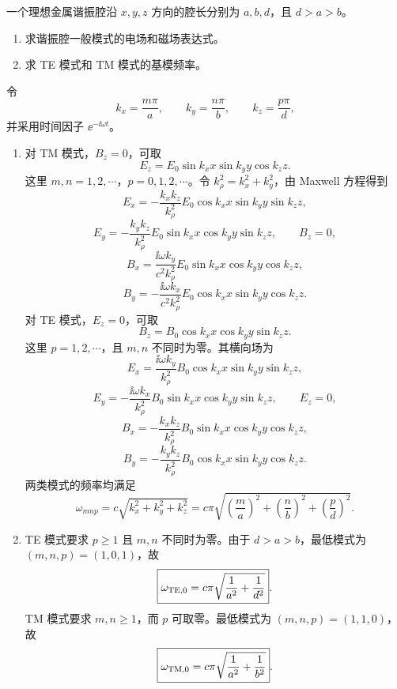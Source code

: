 \begin{question}[理想金属矩形谐振腔]
一个理想金属谐振腔沿 $x,y,z$ 方向的腔长分别为 $a,b,d$，且 $d>a>b$。
\begin{enumerate}
  \item 求谐振腔一般模式的电场和磁场表达式。
  \item 求 TE 模式和 TM 模式的基模频率。
\end{enumerate}
\begin{solution}
令
\[
  k_x=\frac{m\pi}{a},\qquad
  k_y=\frac{n\pi}{b},\qquad
  k_z=\frac{p\pi}{d},
\]
并采用时间因子 $\ee^{-\ii\omega t}$。
\begin{enumerate}
  \item 对 TM 模式，$B_z=0$，可取
  \[
    E_z=E_0\sin k_xx\sin k_yy\cos k_zz .
  \]
  这里 $m,n=1,2,\cdots$，$p=0,1,2,\cdots$。令 $k_\rho^2=k_x^2+k_y^2$，由 Maxwell 方程得到
  \[
    E_x=-\frac{k_xk_z}{k_\rho^2}E_0\cos k_xx\sin k_yy\sin k_zz,
  \]
  \[
    E_y=-\frac{k_yk_z}{k_\rho^2}E_0\sin k_xx\cos k_yy\sin k_zz,
    \qquad B_z=0,
  \]
  \[
    B_x=\frac{\ii\omega k_y}{c^2k_\rho^2}E_0\sin k_xx\cos k_yy\cos k_zz,
  \]
  \[
    B_y=-\frac{\ii\omega k_x}{c^2k_\rho^2}E_0\cos k_xx\sin k_yy\cos k_zz .
  \]
  对 TE 模式，$E_z=0$，可取
  \[
    B_z=B_0\cos k_xx\cos k_yy\sin k_zz .
  \]
  这里 $p=1,2,\cdots$，且 $m,n$ 不同时为零。其横向场为
  \[
    E_x=\frac{\ii\omega k_y}{k_\rho^2}B_0\cos k_xx\sin k_yy\sin k_zz,
  \]
  \[
    E_y=-\frac{\ii\omega k_x}{k_\rho^2}B_0\sin k_xx\cos k_yy\sin k_zz,
    \qquad E_z=0,
  \]
  \[
    B_x=-\frac{k_xk_z}{k_\rho^2}B_0\sin k_xx\cos k_yy\cos k_zz,
  \]
  \[
    B_y=-\frac{k_yk_z}{k_\rho^2}B_0\cos k_xx\sin k_yy\cos k_zz .
  \]
  两类模式的频率均满足
  \[
    \boxed{\omega_{mnp}=c\sqrt{k_x^2+k_y^2+k_z^2}}
    =c\pi\sqrt{\left(\frac{m}{a}\right)^2+
    \left(\frac{n}{b}\right)^2+\left(\frac{p}{d}\right)^2} .
  \]

  \item TE 模式要求 $p\geq1$ 且 $m,n$ 不同时为零。由于 $d>a>b$，最低模式为 $(m,n,p)=(1,0,1)$，故
  \[
    \boxed{\omega_{\rm TE,0}=c\pi\sqrt{\frac1{a^2}+\frac1{d^2}}} .
  \]
  TM 模式要求 $m,n\geq1$，而 $p$ 可取零。最低模式为 $(m,n,p)=(1,1,0)$，故
  \[
    \boxed{\omega_{\rm TM,0}=c\pi\sqrt{\frac1{a^2}+\frac1{b^2}}} .
  \]
\end{enumerate}
\end{solution}
\end{question}

